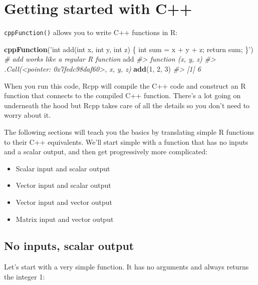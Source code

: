 \documentclass[]{book}
\makeatletter
\newenvironment{Shaded}{\begin{snugshade}}{\end{snugshade}}
\newcommand{\CommentTok}[1]{\textcolor[rgb]{0.37,0.37,0.37}{\textit{#1}}}
\newcommand{\DecValTok}[1]{\textcolor[rgb]{0.06,0.06,0.06}{#1}}
\newcommand{\KeywordTok}[1]{\textcolor[rgb]{0.27,0.27,0.27}{\textbf{#1}}}
\newcommand{\NormalTok}[1]{#1}
\newcommand{\StringTok}[1]{\textcolor[rgb]{0.5,0.5,0.5}{#1}}
\providecommand{\tightlist}{%
  \setlength{\itemsep}{0pt}\setlength{\parskip}{0pt}}
\newcommand{\indexc}[1]{\index{#1@\texttt{#1}}}
\makeatother
\begin{document}
\hypertarget{rcpp-intro}{%
\section{Getting started with C++}\label{rcpp-intro}}

\texttt{cppFunction()} allows you to write C++ functions in R: \indexc{cppFunction()}

\begin{Shaded}
\begin{Highlighting}[]
\KeywordTok{cppFunction}\NormalTok{(}\StringTok{'int add(int x, int y, int z) \{}
\StringTok{  int sum = x + y + z;}
\StringTok{  return sum;}
\StringTok{\}'}\NormalTok{)}
\CommentTok{# add works like a regular R function}
\NormalTok{add}
\CommentTok{#> function (x, y, z) }
\CommentTok{#> .Call(<pointer: 0x7fedc98daf60>, x, y, z)}
\KeywordTok{add}\NormalTok{(}\DecValTok{1}\NormalTok{, }\DecValTok{2}\NormalTok{, }\DecValTok{3}\NormalTok{)}
\CommentTok{#> [1] 6}
\end{Highlighting}
\end{Shaded}

When you run this code, Rcpp will compile the C++ code and construct an R function that connects to the compiled C++ function. There's a lot going on underneath the hood but Rcpp takes care of all the details so you don't need to worry about it.

The following sections will teach you the basics by translating simple R functions to their C++ equivalents. We'll start simple with a function that has no inputs and a scalar output, and then get progressively more complicated:

\begin{itemize}
\tightlist
\item
  Scalar input and scalar output
\item
  Vector input and scalar output
\item
  Vector input and vector output
\item
  Matrix input and vector output
\end{itemize}

\hypertarget{no-inputs-scalar-output}{%
\subsection{No inputs, scalar output}\label{no-inputs-scalar-output}}

Let's start with a very simple function. It has no arguments and always returns the integer 1:
\end{document}

